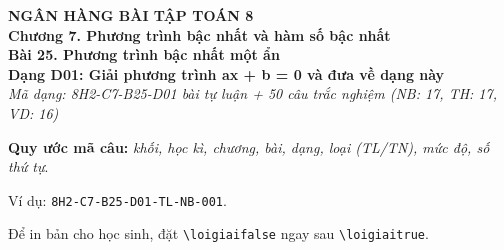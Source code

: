 \documentclass[12pt,a4paper]{article}
\newif\ifloigiai
\begin{document}
\begin{center}
{\Large\textbf{NGÂN HÀNG BÀI TẬP TOÁN 8}}\\[3pt]
\textbf{Chương 7. Phương trình bậc nhất và hàm số bậc nhất}\\[2pt]
\textbf{Bài 25. Phương trình bậc nhất một ẩn}\\[2pt]
\textbf{Dạng D01: Giải phương trình ax + b = 0 và đưa về dạng này}\\[2pt]
\textit{Mã dạng: 8H2-C7-B25-D01  bài tự luận + 50 câu trắc nghiệm \quad (NB: 17, TH: 17, VD: 16)}
\end{center}
\textbf{Quy ước mã câu:} \textit{khối, học kì, chương, bài, dạng, loại (TL/TN), mức độ, số thứ tự}.\par Ví dụ: \texttt{8H2-C7-B25-D01-TL-NB-001}.\par Để in bản cho học sinh, đặt \verb|\loigiaifalse| ngay sau \verb|\loigiaitrue|.
\end{document}
